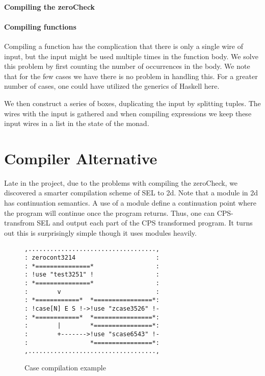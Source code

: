 \paragraph{Compiling the zeroCheck}
\label{sec:compiling-zerochk}


\paragraph{Compiling functions}
\label{sec:compiling-functions}

Compiling a function has the complication that there is only a single
wire of input, but the input might be used multiple times in the
function body. We solve this problem by first counting the number of
occurrences in the body. We note that for the few cases we have there
is no problem in handling this. For a greater number of cases, one could
have utilized the generics of Haskell here.

We then construct a series of boxes, duplicating the input by
splitting tuples. The wires with the input is gathered and when
compiling expressions we keep these input wires in a list in the state
of the monad.


\section{Compiler Alternative}
\label{chap:compiler-alter}

Late in the project, due to the problems with compiling the zeroCheck,
we discovered a smarter compilation scheme of SEL to 2d. Note that
a module in 2d has continuation semantics. A use of a module define a
continuation point where the program will continue once the program
returns. Thus, one can CPS-transfrom SEL and output each part of the
CPS transformed program. It turns out this is surprisingly simple
though it uses modules heavily.

\begin{figure}
  \begin{center}
\begin{verbatim}
,...................................,
: zerocont3214                      :
: *===============*                 :
: !use "test3251" !                 :
: *===============*                 :
:        v                          :
: *============*  *================*:
: !case[N] E S !->!use "zcase3526" !-
: *============*  *================*:
:      	 |        *================*:
:        +------->!use "scase6543" !-
:                 *================*:
,...................................,
\end{verbatim}
  \end{center}
  \caption{Case compilation example}
  \label{fig:2}
\end{figure}

